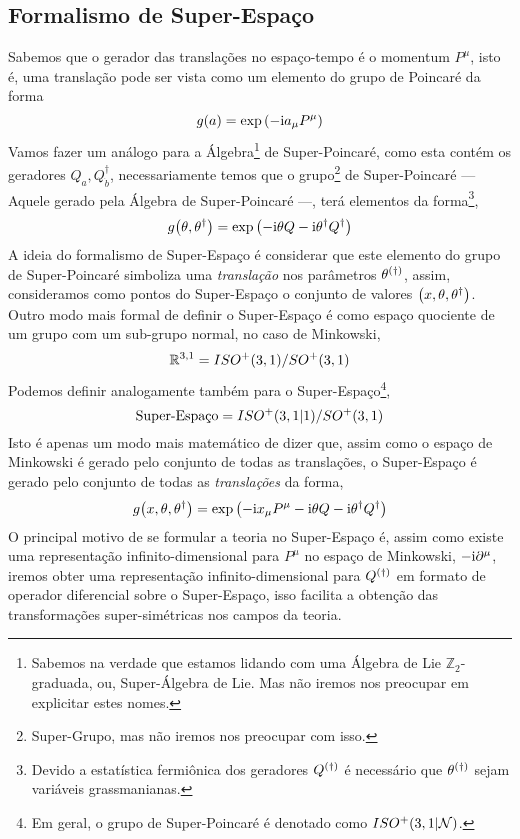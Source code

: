 \subsection{Formalismo de Super-Espaço}
Sabemos que o gerador das translações no espaço-tempo é o momentum $P^\mu$, isto é, uma translação pode ser vista como um 
elemento do grupo de Poincaré da forma\[g\qty(a)=\exp\qty(-\textnormal{i} a_\mu P^\mu)\] Vamos fazer um análogo para a 
Álgebra\footnote{Sabemos na verdade que estamos lidando com uma Álgebra de Lie $\mathbb Z_2$-graduada, ou, Super-Álgebra de Lie. Mas não iremos nos preocupar em explicitar estes nomes.} de Super-Poincaré, como esta contém os geradores $Q_a,Q^\dagger_{\dot b}$, necessariamente temos que 
o grupo\footnote{Super-Grupo, mas não iremos nos preocupar com isso.} de Super-Poincaré --- Aquele gerado pela Álgebra de Super-Poincaré ---, terá elementos da forma\footnote{Devido a estatística fermiônica 
dos geradores $Q^{\qty(\dagger)}$ é necessário que $\theta^{\qty(\dagger)}$ sejam variáveis grassmanianas.},\[g\qty(\theta,\theta^\dagger)=\exp\qty(-\textnormal{i}\theta Q-\textnormal{i}\theta^\dagger Q^\dagger)\]A ideia do formalismo de Super-Espaço é 
considerar que este elemento do grupo de Super-Poincaré simboliza uma \textit{translação} nos parâmetros $\theta^{\qty(\dagger)}$, assim, consideramos como 
pontos do Super-Espaço o conjunto de valores $\qty(x,\theta,\theta^\dagger)$. Outro modo mais formal de definir o Super-Espaço é 
como espaço quociente de um grupo com um sub-grupo normal, no caso de Minkowski,\[\mathbb R^{3,1}=ISO^+\qty(3,1)/SO^+\qty(3,1)\] Podemos 
definir analogamente também para o Super-Espaço\footnote{Em geral, o grupo de Super-Poincaré é denotado como $ISO^+\qty(3,1|\mathcal N)$.},\[\textnormal{Super-Espaço}=ISO^+\qty(3,1|1)/SO^+\qty(3,1)\] Isto é 
apenas um modo mais matemático de dizer que, assim como o espaço de Minkowski é gerado pelo conjunto de todas as 
translações, o Super-Espaço é gerado pelo conjunto de todas as \textit{translações} da forma,\[g\qty(x,\theta,\theta^\dagger)=\exp\qty(-\textnormal{i} x_\mu P^\mu-\textnormal{i}\theta Q-\textnormal{i}\theta^\dagger Q^\dagger)\] O principal 
motivo de se formular a teoria no Super-Espaço é, assim como existe uma representação infinito-dimensional para $P^\mu$ 
no espaço de Minkowski, $-\textnormal{i} \partial^\mu$, iremos obter uma representação infinito-dimensional para $Q^{\qty(\dagger)}$ em formato 
de operador diferencial sobre o Super-Espaço, isso facilita a obtenção das transformações super-simétricas nos campos da teoria.
